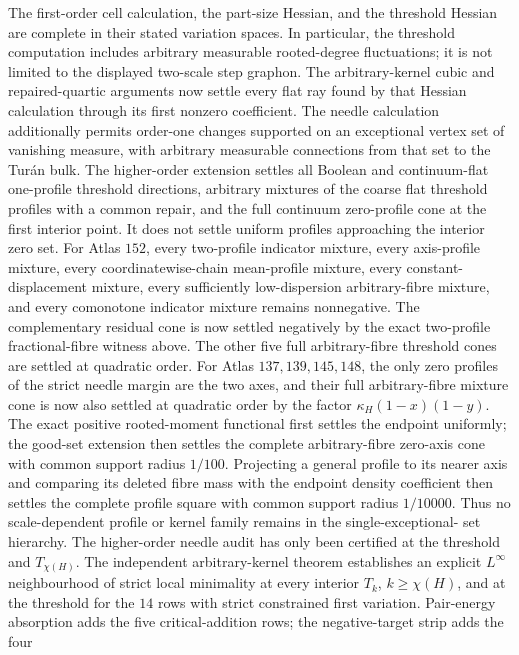 \documentclass[11pt]{article}
\begin{document}
The first-order cell calculation, the part-size Hessian, and the threshold
Hessian are complete in their stated variation spaces.  In particular, the
threshold computation includes arbitrary measurable rooted-degree
fluctuations; it is not limited to the displayed two-scale step graphon.  The
arbitrary-kernel cubic and repaired-quartic arguments now settle every flat
ray found by that Hessian calculation through its first nonzero coefficient.
The needle calculation additionally permits order-one changes supported on
an exceptional vertex set of vanishing measure, with arbitrary measurable
connections from that set to the Tur\'an bulk.  The higher-order extension
settles all Boolean and continuum-flat one-profile threshold directions,
arbitrary mixtures of the coarse flat threshold profiles with a common
repair, and the full continuum zero-profile cone at the first interior point.
It does not settle uniform profiles approaching the interior zero set.  For
Atlas $152$, every two-profile indicator mixture, every axis-profile mixture,
every coordinatewise-chain
mean-profile mixture, every constant-displacement mixture, every sufficiently
low-dispersion arbitrary-fibre mixture, and every comonotone indicator
mixture remains nonnegative.  The complementary residual cone is now settled
negatively by the exact two-profile fractional-fibre witness above.  The other
five full arbitrary-fibre threshold cones are settled at quadratic order.
For Atlas $137,139,145,148$, the only zero profiles of the strict needle
margin are the two axes, and their full arbitrary-fibre mixture cone is now
also settled at quadratic order by the factor
$\kappa_H(1-x)(1-y)$.  The exact positive rooted-moment functional first
settles the endpoint uniformly; the good-set extension then settles the
complete arbitrary-fibre zero-axis cone with common support radius $1/100$.
Projecting a general profile to its nearer axis and comparing its deleted
fibre mass with the endpoint density coefficient then settles the complete
profile square with common support radius $1/10000$.  Thus no
scale-dependent profile or kernel family remains in the single-exceptional-
set hierarchy.
The higher-order needle audit has only been certified at the threshold and
$T_{\chi(H)}$.  The independent arbitrary-kernel theorem establishes an
explicit $L^\infty$ neighbourhood of strict local minimality at every
interior $T_k$, $k\geq\chi(H)$, and at the threshold for the $14$ rows with
strict constrained first variation.  Pair-energy absorption adds the five
critical-addition rows; the negative-target strip adds the four
\end{document}

